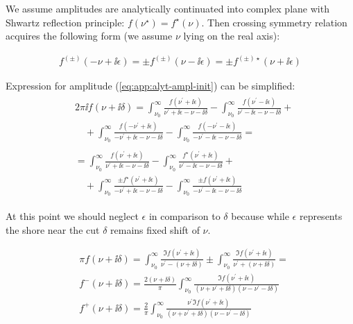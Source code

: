 We assume amplitudes are analytically continuated into complex plane with Shwartz reflection principle: $f(\nu^\star) = f^\star(\nu)$. Then crossing symmetry relation acquires the following form (we assume $\nu$ lying on the real axis):

\begin{align}
    f^{(\pm)}(-\nu+\ii \epsilon) = \pm f^{(\pm)}(\nu - \ii \epsilon) = \pm f^{(\pm)\star}(\nu + \ii \epsilon)
\end{align}

Expression for amplitude (\cref{eq:app:alyt-ampl-init}) can be simplified:
\begin{align}
    \begin{split}
        &2 \pi \ii f(\nu+\ii\delta) = \int_{\nu_0}^{\infty} \frac{f(\nu^\prime + \ii \epsilon)}{\nu^\prime + \ii \epsilon - \nu - \ii \delta} - \int_{\nu_0}^{\infty} \frac{f(\nu^\prime-\ii \epsilon)}{\nu^\prime - \ii \epsilon - \nu - \ii \delta} + \\
        &\quad + \int_{\nu_0}^{\infty} \frac{f(-\nu^\prime+\ii \epsilon)}{-\nu^\prime + \ii \epsilon - \nu - \ii \delta} - \int_{\nu_0}^{\infty} \frac{f(-\nu^\prime-\ii \epsilon)}{-\nu^\prime - \ii \epsilon - \nu - \ii \delta} =
    \end{split} \\
    \begin{split}
        &= \int_{\nu_0}^{\infty} \frac{f(\nu^\prime + \ii \epsilon)}{\nu^\prime + \ii \epsilon - \nu - \ii \delta} - \int_{\nu_0}^{\infty} \frac{f^\star(\nu^\prime+\ii \epsilon)}{\nu^\prime - \ii \epsilon - \nu - \ii \delta} +  \\
        &\quad + \int_{\nu_0}^{\infty} \frac{\pm f^\star(\nu^\prime+\ii \epsilon)}{-\nu^\prime + \ii \epsilon - \nu - \ii \delta} - \int_{\nu_0}^{\infty} \frac{\pm f(\nu^\prime+\ii \epsilon)}{-\nu^\prime - \ii \epsilon - \nu - \ii \delta}
    \end{split}
\end{align}

At this point we should neglect $\epsilon$ in comparison to $\delta$ because while $\epsilon$ represents the shore near the cut $\delta$ remains fixed shift of $\nu$.

\begin{align}
    &\pi f(\nu+\ii\delta) = \int_{\nu_0}^{\infty} \frac{\Im f(\nu^\prime + \ii \epsilon)}{\nu^\prime - (\nu+\ii \delta)} \pm \int_{\nu_0}^{\infty} \frac{\Im f(\nu^\prime+\ii \epsilon)}{\nu^\prime + (\nu+\ii\delta)} = \\
    &f^{-}(\nu+\ii \delta) = \frac{2 (\nu+\ii \delta)}{\pi} \int_{\nu_0}^{\infty} \frac{\Im f(\nu^\prime + \ii \epsilon)}{(\nu + \nu^\prime + \ii \delta)(\nu - \nu^\prime - \ii \delta)} \\
    &f^{+}(\nu+\ii \delta) = \frac{2}{\pi} \int_{\nu_0}^{\infty} \frac{\nu^\prime \Im f(\nu^\prime + \ii \epsilon)}{(\nu + \nu^\prime + \ii \delta)(\nu - \nu^\prime - \ii\delta)}
\end{align}


